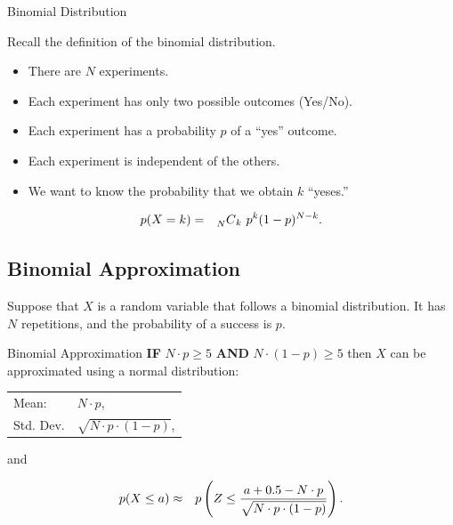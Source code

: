 \begin{frame}{Binomial Distribution}

  Recall the definition of the binomial distribution.

  \vfill

  \begin{definition}
    \begin{itemize}
    \item There are $N$ experiments.
    \item Each experiment has only two possible outcomes (Yes/No).
    \item Each experiment has a probability $p$ of a ``yes'' outcome.
    \item Each experiment is independent of the others.
    \item We want to know the probability that we obtain $k$ ``yeses.''
    \end{itemize}
    \begin{eqnarray*}
      p(X=k) & = & \prescript{~}{N}{C}_k ~ p^k (1-p)^{N-k}.
    \end{eqnarray*}
  \end{definition}

  \vfill

\end{frame}

\subsection{Binomial Approximation}


\begin{frame}

    Suppose that $X$ is a random variable that follows a binomial
    distribution. It has $N$ repetitions, and the probability of a
    success is $p$. 


  \begin{block}{Binomial Approximation}
    \textbf{IF} $N\cdot p\geq 5$ \textbf{AND} $N\cdot (1-p) \geq 5$
    then $X$ can be approximated using a normal distribution:

    \begin{center}
      \begin{tabular}{ll}
        Mean: & $N\cdot p$, \\
        Std. Dev. & $\sqrt{N\cdot p \cdot (1-p)}$,
      \end{tabular}
    \end{center}

    and

    \begin{eqnarray*}
      p(X \leq a) & \approx &
       p\left( Z \leq \frac{a+0.5-N\cdot p}{\sqrt{N\cdot p \cdot (1-p)}}\right).
    \end{eqnarray*}

  \end{block}

\end{frame}

